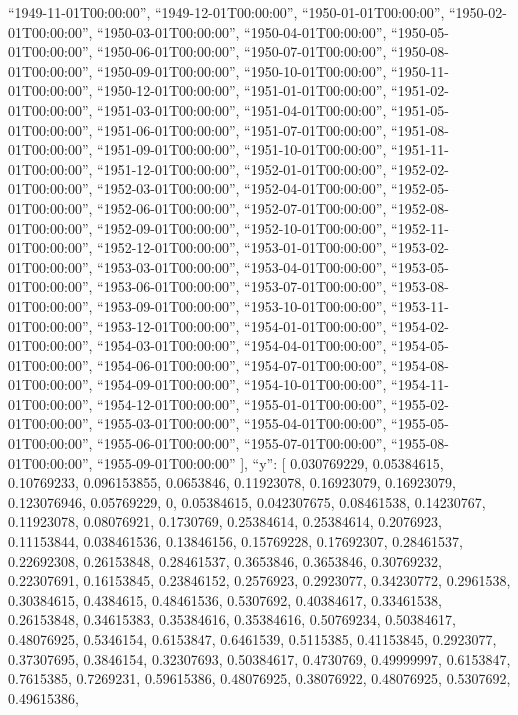 \documentclass[
]{article}
\begin{document}
``1949-11-01T00:00:00'', ``1949-12-01T00:00:00'',
``1950-01-01T00:00:00'', ``1950-02-01T00:00:00'',
``1950-03-01T00:00:00'', ``1950-04-01T00:00:00'',
``1950-05-01T00:00:00'', ``1950-06-01T00:00:00'',
``1950-07-01T00:00:00'', ``1950-08-01T00:00:00'',
``1950-09-01T00:00:00'', ``1950-10-01T00:00:00'',
``1950-11-01T00:00:00'', ``1950-12-01T00:00:00'',
``1951-01-01T00:00:00'', ``1951-02-01T00:00:00'',
``1951-03-01T00:00:00'', ``1951-04-01T00:00:00'',
``1951-05-01T00:00:00'', ``1951-06-01T00:00:00'',
``1951-07-01T00:00:00'', ``1951-08-01T00:00:00'',
``1951-09-01T00:00:00'', ``1951-10-01T00:00:00'',
``1951-11-01T00:00:00'', ``1951-12-01T00:00:00'',
``1952-01-01T00:00:00'', ``1952-02-01T00:00:00'',
``1952-03-01T00:00:00'', ``1952-04-01T00:00:00'',
``1952-05-01T00:00:00'', ``1952-06-01T00:00:00'',
``1952-07-01T00:00:00'', ``1952-08-01T00:00:00'',
``1952-09-01T00:00:00'', ``1952-10-01T00:00:00'',
``1952-11-01T00:00:00'', ``1952-12-01T00:00:00'',
``1953-01-01T00:00:00'', ``1953-02-01T00:00:00'',
``1953-03-01T00:00:00'', ``1953-04-01T00:00:00'',
``1953-05-01T00:00:00'', ``1953-06-01T00:00:00'',
``1953-07-01T00:00:00'', ``1953-08-01T00:00:00'',
``1953-09-01T00:00:00'', ``1953-10-01T00:00:00'',
``1953-11-01T00:00:00'', ``1953-12-01T00:00:00'',
``1954-01-01T00:00:00'', ``1954-02-01T00:00:00'',
``1954-03-01T00:00:00'', ``1954-04-01T00:00:00'',
``1954-05-01T00:00:00'', ``1954-06-01T00:00:00'',
``1954-07-01T00:00:00'', ``1954-08-01T00:00:00'',
``1954-09-01T00:00:00'', ``1954-10-01T00:00:00'',
``1954-11-01T00:00:00'', ``1954-12-01T00:00:00'',
``1955-01-01T00:00:00'', ``1955-02-01T00:00:00'',
``1955-03-01T00:00:00'', ``1955-04-01T00:00:00'',
``1955-05-01T00:00:00'', ``1955-06-01T00:00:00'',
``1955-07-01T00:00:00'', ``1955-08-01T00:00:00'',
``1955-09-01T00:00:00'' {]}, ``y'': {[} 0.030769229, 0.05384615,
0.10769233, 0.096153855, 0.0653846, 0.11923078, 0.16923079, 0.16923079,
0.123076946, 0.05769229, 0, 0.05384615, 0.042307675, 0.08461538,
0.14230767, 0.11923078, 0.08076921, 0.1730769, 0.25384614, 0.25384614,
0.2076923, 0.11153844, 0.038461536, 0.13846156, 0.15769228, 0.17692307,
0.28461537, 0.22692308, 0.26153848, 0.28461537, 0.3653846, 0.3653846,
0.30769232, 0.22307691, 0.16153845, 0.23846152, 0.2576923, 0.2923077,
0.34230772, 0.2961538, 0.30384615, 0.4384615, 0.48461536, 0.5307692,
0.40384617, 0.33461538, 0.26153848, 0.34615383, 0.35384616, 0.35384616,
0.50769234, 0.50384617, 0.48076925, 0.5346154, 0.6153847, 0.6461539,
0.5115385, 0.41153845, 0.2923077, 0.37307695, 0.3846154, 0.32307693,
0.50384617, 0.4730769, 0.49999997, 0.6153847, 0.7615385, 0.7269231,
0.59615386, 0.48076925, 0.38076922, 0.48076925, 0.5307692, 0.49615386,
\end{document}
